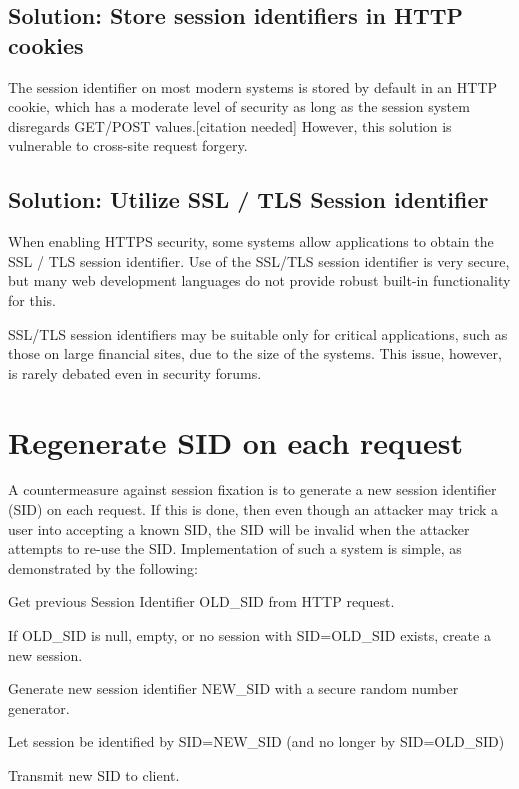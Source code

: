 \subsection{Solution: Store session identifiers in HTTP cookies}

The session identifier on most modern systems is stored by default in an HTTP cookie, which has a moderate level of security as long as the session system disregards GET/POST values.[citation needed] However, this solution is vulnerable to cross-site request forgery.





\subsection{Solution: Utilize SSL / TLS Session identifier}

When enabling HTTPS security, some systems allow applications to obtain the SSL / TLS session identifier. Use of the SSL/TLS session identifier is very secure, but many web development languages do not provide robust built-in functionality for this.

SSL/TLS session identifiers may be suitable only for critical applications, such as those on large financial sites, due to the size of the systems. This issue, however, is rarely debated even in security forums.

\section{Regenerate SID on each request}

A countermeasure against session fixation is to generate a new session identifier (SID) on each request. If this is done, then even though an attacker may trick a user into accepting a known SID, the SID will be invalid when the attacker attempts to re-use the SID. Implementation of such a system is simple, as demonstrated by the following:

\begin{compactitem}
\item Get previous Session Identifier OLD\_SID from HTTP request.
\item If OLD\_SID is null, empty, or no session with SID=OLD\_SID exists, create a new session.
\item Generate new session identifier NEW\_SID with a secure random number generator.
\item Let session be identified by SID=NEW\_SID (and no longer by SID=OLD\_SID)
\item Transmit new SID to client.
\end{compactitem}

